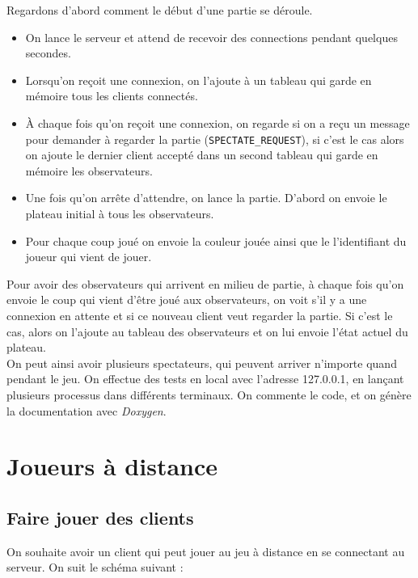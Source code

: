 \documentclass[a4paper]{article}
\begin{document}
\noindent Regardons d'abord comment le début d'une partie se déroule.
\begin{itemize}
	\setlength\itemsep{0.5em}
	\item On lance le serveur et attend de recevoir des connections pendant 
	quelques secondes.
	\item Lorsqu'on reçoit une connexion, on l'ajoute à un tableau qui garde en 
	mémoire tous les clients connectés.
	\item À chaque fois qu'on reçoit une connexion, on regarde si on a reçu un 
	message pour demander à regarder la partie (\texttt{SPECTATE\_REQUEST}), si c'est le cas alors on ajoute 
	le dernier client accepté dans un second tableau qui garde en mémoire les 
	observateurs.
	\item Une fois qu'on arrête d'attendre, on lance la partie. D'abord on 
	envoie le plateau initial à tous les observateurs.
	\item Pour chaque coup joué on envoie la couleur jouée ainsi que le 
	l'identifiant du joueur qui vient de jouer. \\
\end{itemize}

\noindent Pour avoir des observateurs qui arrivent en milieu de partie, à chaque fois
qu'on envoie le coup qui vient d'être joué aux observateurs, on voit s'il y a
une connexion en attente et si ce nouveau client veut regarder la partie. Si c'est le cas, alors 
on l'ajoute au tableau des observateurs et on lui envoie l'état actuel du
plateau. \\

On peut ainsi avoir plusieurs spectateurs, qui peuvent arriver n'importe quand pendant le jeu. On effectue des tests en local avec l'adresse 127.0.0.1, en lançant plusieurs processus dans différents terminaux. On commente le code, et on génère la documentation avec \emph{Doxygen}.


\section{Joueurs à distance}

\subsection{Faire jouer des clients}

On souhaite avoir un client qui peut jouer au jeu à distance en se connectant au serveur. On suit le schéma suivant :
\end{document}
